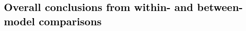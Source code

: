 \documentclass[draft]{agujournal2019}
\renewcommand{\st}[1]{\unskip}
\newcommand{\newTxt}{\textcolor{black}}
\begin{document}

\subsection{\newTxt{Overall conclusions from within- and between-model comparisons}} \label{subsec:overall}
\end{document}
